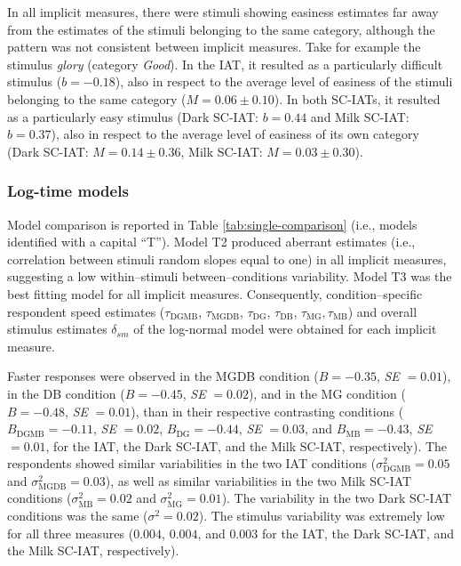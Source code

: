 \documentclass[12pt]{book}
\begin{document}
In all implicit measures, there were stimuli showing easiness estimates far away from the estimates of the stimuli belonging to the same category, although the pattern was not consistent between implicit measures.
Take for example the stimulus \emph{glory} (category \emph{Good}). 
In the IAT, it resulted as a particularly difficult stimulus ($b = -0.18$), also in respect to the average level of
easiness of the stimuli belonging to the same category ($M = 0.06 \pm 0.10$). 
In both SC-IATs, it resulted as a particularly easy stimulus (Dark SC-IAT: $b = 0.44$ and Milk SC-IAT: $b = 0.37$), also in respect to the average level of easiness of its own category (Dark SC-IAT: $M = 0.14\pm0.36$, Milk SC-IAT: $M = 0.03\pm0.30$).

\subsubsection{Log-time models}

Model comparison is reported in Table \ref{tab:single-comparison} (i.e., models identified with a capital ``T''). 
Model T2 produced aberrant estimates (i.e., correlation between stimuli random slopes equal to one) in all implicit measures, suggesting a low within--stimuli between--conditions variability. 
Model T3 was the best fitting model for all implicit measures. 
Consequently, condition--specific respondent speed estimates ($\tau_{\text{DGMB}}$, $\tau_{\text{MGDB}}$, $\tau_{\text{DG}}$, $\tau_{\text{DB}}$, $\tau_{\text{MG}}, $$\tau_{\text{MB}}$) and overall stimulus estimates $\delta_{sm}$ of the log-normal model were obtained for each implicit measure. 

Faster responses were observed in the MGDB condition ($B = -0.35$, \emph{SE} $= 0.01$), in the DB condition ($B = -0.45$, \emph{SE}  $= 0.02$), and in the MG condition ($B = -0.48$, \emph{SE}  $= 0.01$), than in their respective contrasting conditions ($B_{\text{DGMB}} = -0.11$, \emph{SE}   $= 0.02$, $B_{\text{DG}} = -0.44$, \emph{SE}  $= 0.03$, and $B_{\text{MB}} = -0.43$, \emph{SE}  $= 0.01$, for the IAT, the Dark SC-IAT, and the Milk SC-IAT, respectively).
The respondents showed similar variabilities in the two IAT conditions ($\sigma_{\text{DGMB}}^2 = 0.05$ and $\sigma_{\text{MGDB}}^2 = 0.03$), as well as similar variabilities in the two Milk SC-IAT conditions ($\sigma_{\text{MB}}^2 =0.02$ and $\sigma_{\text{MG}}^2 =0.01$). The variability in the two Dark SC-IAT conditions was the same ($\sigma^2 =0.02$). The stimulus variability was extremely low for all three measures ($0.004$, $0.004$, and $0.003$ for the IAT, the Dark SC-IAT, and the Milk SC-IAT, respectively).
\end{document}
